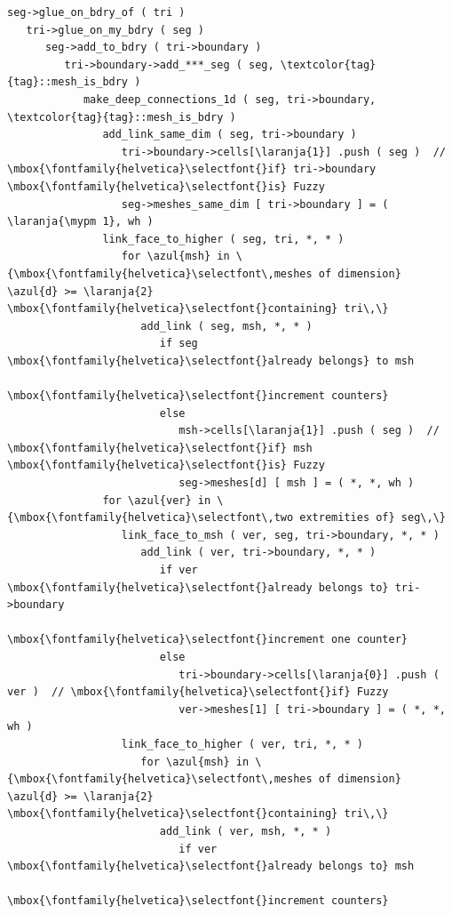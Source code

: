 \def\mypm{$\pm$}
\begin{Verbatim}[commandchars=\\\{\},formatcom=\small\tt,baselinestretch=0.94]
seg->glue_on_bdry_of ( tri )
   tri->glue_on_my_bdry ( seg )
      seg->add_to_bdry ( tri->boundary )
         tri->boundary->add_***_seg ( seg, \textcolor{tag}{tag}::mesh_is_bdry )
            make_deep_connections_1d ( seg, tri->boundary, \textcolor{tag}{tag}::mesh_is_bdry )
               add_link_same_dim ( seg, tri->boundary )
                  tri->boundary->cells[\laranja{1}] .push ( seg )  // \mbox{\fontfamily{helvetica}\selectfont{}if} tri->boundary \mbox{\fontfamily{helvetica}\selectfont{}is} Fuzzy
                  seg->meshes_same_dim [ tri->boundary ] = ( \laranja{\mypm 1}, wh )
               link_face_to_higher ( seg, tri, *, * )
                  for \azul{msh} in \{\mbox{\fontfamily{helvetica}\selectfont\,meshes of dimension} \azul{d} >= \laranja{2} \mbox{\fontfamily{helvetica}\selectfont{}containing} tri\,\}
                     add_link ( seg, msh, *, * )
                        if seg \mbox{\fontfamily{helvetica}\selectfont{}already belongs} to msh
                           \mbox{\fontfamily{helvetica}\selectfont{}increment counters}
                        else
                           msh->cells[\laranja{1}] .push ( seg )  // \mbox{\fontfamily{helvetica}\selectfont{}if} msh \mbox{\fontfamily{helvetica}\selectfont{}is} Fuzzy
                           seg->meshes[d] [ msh ] = ( *, *, wh )
               for \azul{ver} in \{\mbox{\fontfamily{helvetica}\selectfont\,two extremities of} seg\,\}
                  link_face_to_msh ( ver, seg, tri->boundary, *, * )
                     add_link ( ver, tri->boundary, *, * )
                        if ver \mbox{\fontfamily{helvetica}\selectfont{}already belongs to} tri->boundary
                           \mbox{\fontfamily{helvetica}\selectfont{}increment one counter}
                        else
                           tri->boundary->cells[\laranja{0}] .push ( ver )  // \mbox{\fontfamily{helvetica}\selectfont{}if} Fuzzy
                           ver->meshes[1] [ tri->boundary ] = ( *, *, wh )
                  link_face_to_higher ( ver, tri, *, * )
                     for \azul{msh} in \{\mbox{\fontfamily{helvetica}\selectfont\,meshes of dimension} \azul{d} >= \laranja{2} \mbox{\fontfamily{helvetica}\selectfont{}containing} tri\,\}
                        add_link ( ver, msh, *, * )
                           if ver \mbox{\fontfamily{helvetica}\selectfont{}already belongs to} msh
                              \mbox{\fontfamily{helvetica}\selectfont{}increment counters}

\end{Verbatim}
